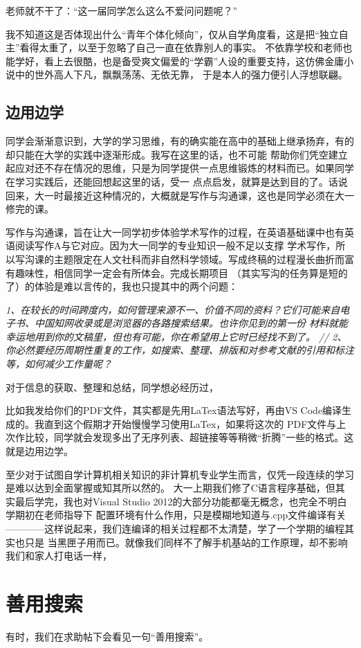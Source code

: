 \documentclass[12pt]{article}
\begin{document}
老师就不干了：“这一届同学怎么这么不爱问问题呢？”

我不知道这是否体现出什么“青年个体化倾向”，仅从自学角度看，这是把“独立自主”看得太重了，以至于忽略了自己一直在依靠别人的事实。
不依靠学校和老师也能学好，看上去很酷，也是备受爽文偏爱的“学霸”人设的重要支持，这仿佛金庸小说中的世外高人下凡，飘飘荡荡、无依无靠，
于是本人的强力便引人浮想联翩。
\subsection{边用边学}
同学会渐渐意识到，大学的学习思维，有的确实能在高中的基础上继承扬弃，有的却只能在大学的实践中逐渐形成。我写在这里的话，也不可能
帮助你们凭空建立起应对还不存在情况的思维，只是为同学提供一点思维锻炼的材料而已。如果同学在学习实践后，还能回想起这里的话，受一
点点启发，就算是达到目的了。话说回来，大一时最接近这种情况的，大概就是写作与沟通课，这也是同学必须在大一修完的课。

写作与沟通课，旨在让大一同学初步体验学术写作的过程，在英语基础课中也有英语阅读写作A与它对应。因为大一同学的专业知识一般不足以支撑
学术写作，所以写沟课的主题限定在人文社科而非自然科学领域。写成终稿的过程漫长曲折而富有趣味性，相信同学一定会有所体会。完成长期项目
（其实写沟的任务算是短的了）的体验是难以言传的，我也只提其中的两个问题：

\textit{
1、在较长的时间跨度内，如何管理来源不一、价值不同的资料？它们可能来自电子书、中国知网收录或是浏览器的各路搜索结果。也许你见到的第一份
材料就能幸运地用到你的文稿里，但也有可能，你在希望用上它时已经找不到了。
//
2、你必然要经历周期性重复的工作，如搜索、整理、排版和对参考文献的引用和标注等，如何减少工作量呢？
}

对于信息的获取、整理和总结，同学想必经历过，

比如我发给你们的PDF文件，其实都是先用LaTex语法写好，再由VS Code编译生成的。我直到这个假期才开始慢慢学习使用LaTex，如果将这次的
PDF文件与上次作比较，同学就会发现多出了无序列表、超链接等等稍微“折腾”一些的格式。这就是边用边学。

至少对于试图自学计算机相关知识的非计算机专业学生而言，仅凭一段连续的学习是难以达到全面掌握或知其所以然的。
大一上期我们修了C语言程序基础，但其实最后学完，我也对Visual Studio 2012的大部分功能都毫无概念，也完全不明白学期初在老师指导下
配置环境有什么作用，只是模糊地知道与.cpp文件编译有关————这样说起来，我们连编译的相关过程都不太清楚，学了一个学期的编程其实也只是
当黑匣子用而已。就像我们同样不了解手机基站的工作原理，却不影响我们和家人打电话一样，
\section{善用搜索}
有时，我们在求助帖下会看见一句“善用搜索”。
\end{document}
